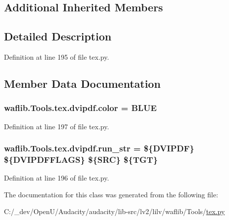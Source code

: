 \subsection*{Additional Inherited Members}


\subsection{Detailed Description}


Definition at line 195 of file tex.\+py.



\subsection{Member Data Documentation}
\subsubsection[{\texorpdfstring{color}{color}}]{ waflib.\+Tools.\+tex.\+dvipdf.\+color = \textquotesingle{}B\+L\+UE\textquotesingle{}\hspace{0.3cm}{\ttfamily [static]}}\hypertarget{classwaflib_1_1_tools_1_1tex_1_1dvipdf_a89bece1bbcae034b108fb52b7e3995f5}{}\label{classwaflib_1_1_tools_1_1tex_1_1dvipdf_a89bece1bbcae034b108fb52b7e3995f5}


Definition at line 197 of file tex.\+py.

\subsubsection[{\texorpdfstring{run\+\_\+str}{run_str}}]{ waflib.\+Tools.\+tex.\+dvipdf.\+run\+\_\+str = \textquotesingle{}\$\{D\+V\+I\+P\+DF\} \$\{D\+V\+I\+P\+D\+F\+F\+L\+A\+GS\} \$\{S\+RC\} \$\{T\+GT\}\textquotesingle{}\hspace{0.3cm}{\ttfamily [static]}}\hypertarget{classwaflib_1_1_tools_1_1tex_1_1dvipdf_a7f951090524b0cb4ac5f625780541665}{}\label{classwaflib_1_1_tools_1_1tex_1_1dvipdf_a7f951090524b0cb4ac5f625780541665}


Definition at line 196 of file tex.\+py.



The documentation for this class was generated from the following file\+:\begin{DoxyCompactItemize}
\item 
C\+:/\+\_\+dev/\+Open\+U/\+Audacity/audacity/lib-\/src/lv2/lilv/waflib/\+Tools/\hyperlink{lilv_2waflib_2_tools_2tex_8py}{tex.\+py}\end{DoxyCompactItemize}
